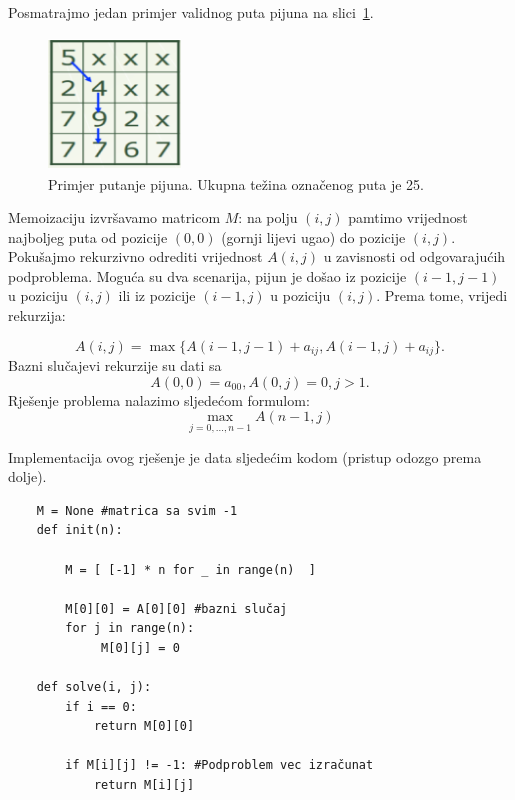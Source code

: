 \begin{solution}
	Posmatrajmo jedan primjer validnog puta pijuna na slici~\ref{fig:pijun-putanja}. 
	
	
	\begin{figure}
		\centering
		\includegraphics[width=100pt,height=100pt]{slike/dp-table-1.png}
		\caption{Primjer putanje pijuna. Ukupna težina označenog puta je 25.} \label{fig:pijun-putanja}
	\end{figure}

Memoizaciju izvršavamo matricom $M$: na polju $(i , j)$ pamtimo
vrijednost najboljeg puta od pozicije $(0, 0)$ (gornji lijevi ugao) do pozicije $(i , j)$. Pokušajmo   rekurzivno odrediti vrijednost $A(i,j)$ u zavisnosti od odgovarajućih podproblema. Moguća su dva scenarija, pijun je  došao iz pozicije $(i-1, j-1)$ u poziciju $(i,j)$ ili iz pozicije $(i-1, j)$ u poziciju $(i, j)$. Prema tome, vrijedi rekurzija: 

\begin{equation}
	A(i,j) = \max\{ A(i-1, j-1) + a_{ij}, A(i-1, j) + a_{ij}   \}.
\end{equation}
Bazni slučajevi rekurzije su dati sa 
\begin{equation}
	A(0, 0) = a_{00}, A(0, j) = 0, j > 1.
\end{equation}
Rješenje problema nalazimo sljedećom formulom:
\begin{equation}
	\max_{j=0, \ldots, n-1}A(n-1, j)
\end{equation}

Implementacija ovog rješenje je data sljedećim kodom (pristup odozgo prema dolje).

\begin{verbatim}
	M = None #matrica sa svim -1
	def init(n):
        
        M = [ [-1] * n for _ in range(n)  ]
		
        M[0][0] = A[0][0] #bazni slučaj
        for j in range(n):
             M[0][j] = 0
	
	def solve(i, j):
		if i == 0:
			return M[0][0]
			
		if M[i][j] != -1: #Podproblem vec izračunat
			return M[i][j]
		

\end{verbatim}
\end{solution}
